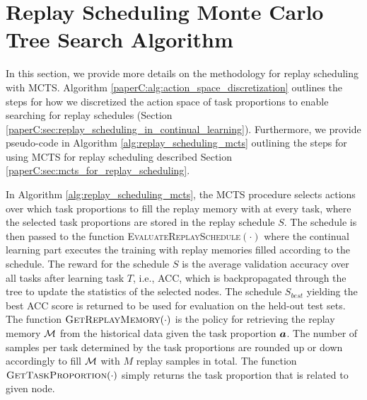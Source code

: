 

\section[Replay Scheduling MCTS Algorithm]{Replay Scheduling Monte Carlo Tree Search Algorithm}\label{paperC:app:rs_mcts_algorithm}



In this section, we provide more details on the methodology for replay scheduling with MCTS. Algorithm \ref{paperC:alg:action_space_discretization} outlines the steps for how we discretized the action space of task proportions to enable searching for replay schedules (Section \ref{paperC:sec:replay_scheduling_in_continual_learning}). Furthermore, we provide pseudo-code in Algorithm \ref{alg:replay_scheduling_mcts} outlining the steps for using MCTS for replay scheduling described Section \ref{paperC:sec:mcts_for_replay_scheduling}. %

In Algorithm \ref{alg:replay_scheduling_mcts}, the MCTS procedure selects actions over which task proportions to fill the replay memory with at every task, where the selected task proportions are stored in the replay schedule $S$. The schedule is then passed to 
the function \textsc{EvaluateReplaySchedule$(\cdot)$} 
where the continual learning part executes the training with replay memories filled according to the schedule. The reward for the schedule $S$ is the average validation accuracy over all tasks after learning task $T$, i.e., ACC, which is backpropagated through the tree to update the statistics of the selected nodes. The schedule $S_{best}$ yielding the best ACC score is returned to be used for evaluation on the held-out test sets. The function $\textsc{GetReplayMemory}(\cdot)$ is the policy for retrieving the replay memory ${\mathcal{M}}$ from the historical data given the task proportion ${\bm{a}}$. The number of samples per task determined by the task proportions are rounded up or down accordingly to fill ${\mathcal{M}}$ with $M$ replay samples in total. 
The function $\textsc{GetTaskProportion}(\cdot)$ simply returns the task proportion that is related to given node.



